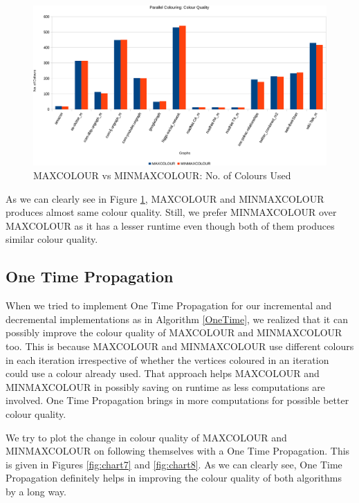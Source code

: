 \documentclass[MTech]{iitmdiss}
\begin{document}
\begin{figure}[h]
    \centering
    \includegraphics[width=\textwidth,keepaspectratio=true]{chartNewest6.pdf}
    \caption{
        MAXCOLOUR vs MINMAXCOLOUR: No. of Colours Used
    }
    \label{fig:chart6}
\end{figure}

As we can clearly see in Figure \ref{fig:chart6}, MAXCOLOUR and MINMAXCOLOUR produces almost same colour quality. Still, we prefer MINMAXCOLOUR over MAXCOLOUR as it has a lesser runtime even though both of them produces similar colour quality.

\subsection{One Time Propagation}
When we tried to implement One Time Propagation for our incremental and decremental implementations as in Algorithm \ref{OneTime}, we realized that it can possibly improve the colour quality of MAXCOLOUR and MINMAXCOLOUR too. This is because MAXCOLOUR and MINMAXCOLOUR use different colours in each iteration irrespective of whether the vertices coloured in an iteration could use a colour already used. That approach helps MAXCOLOUR and MINMAXCOLOUR in possibly saving on runtime as less computations are involved. One Time Propagation brings in more computations for possible better colour quality.

We try to plot the change in colour quality of MAXCOLOUR and MINMAXCOLOUR on following themselves with a One Time Propagation. This is given in Figures \ref{fig:chart7} and \ref{fig:chart8}. As we can clearly see, One Time Propagation definitely helps in improving the colour quality of both algorithms by a long way. 
\end{document}
